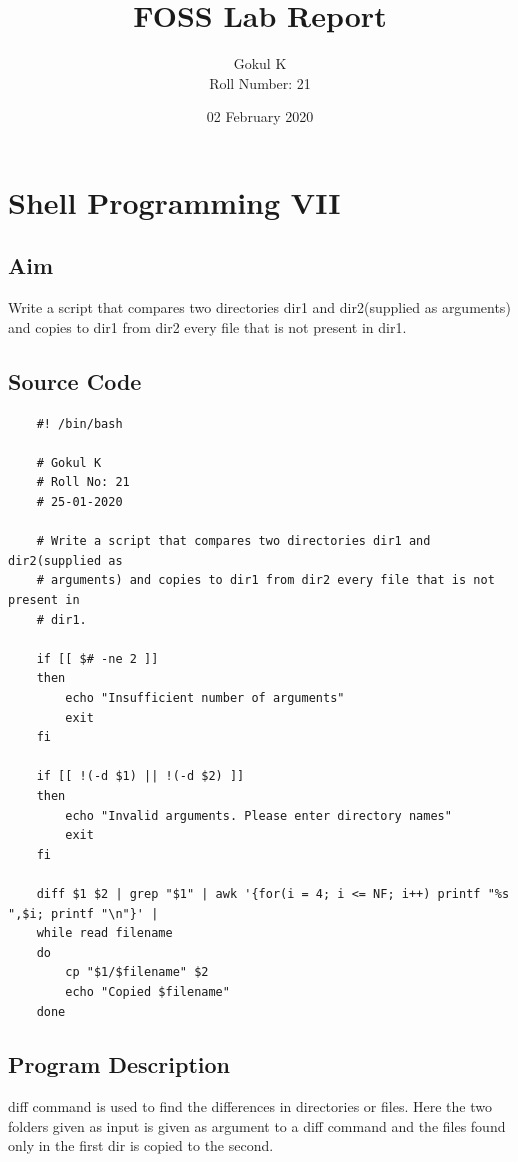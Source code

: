 \documentclass{article}
\begin{document}
\title{FOSS Lab Report}
\author{Gokul K\\[2\baselineskip]
Roll Number: 21\\[2\baselineskip]}
\date{02 February 2020}

\maketitle

\setcounter{section}{10}
\section{Shell Programming VII}
\subsection{Aim}
Write a script that compares two directories dir1 and dir2(supplied as
arguments) and copies to dir1 from dir2 every file that is not present in
dir1.


\subsection{Source Code}
\begin{verbatim}
    #! /bin/bash

    # Gokul K
    # Roll No: 21
    # 25-01-2020

    # Write a script that compares two directories dir1 and dir2(supplied as
    # arguments) and copies to dir1 from dir2 every file that is not present in
    # dir1.

    if [[ $# -ne 2 ]]
    then
        echo "Insufficient number of arguments"
        exit
    fi

    if [[ !(-d $1) || !(-d $2) ]]
    then
        echo "Invalid arguments. Please enter directory names"
        exit
    fi

    diff $1 $2 | grep "$1" | awk '{for(i = 4; i <= NF; i++) printf "%s ",$i; printf "\n"}' |
    while read filename
    do
        cp "$1/$filename" $2
        echo "Copied $filename"
    done
\end{verbatim}

\subsection{Program Description}
diff command is used to find the differences in directories or files. Here
the two folders given as input is given as argument to a diff command and
the files found only in the first dir is copied to the second.
\end{document}
